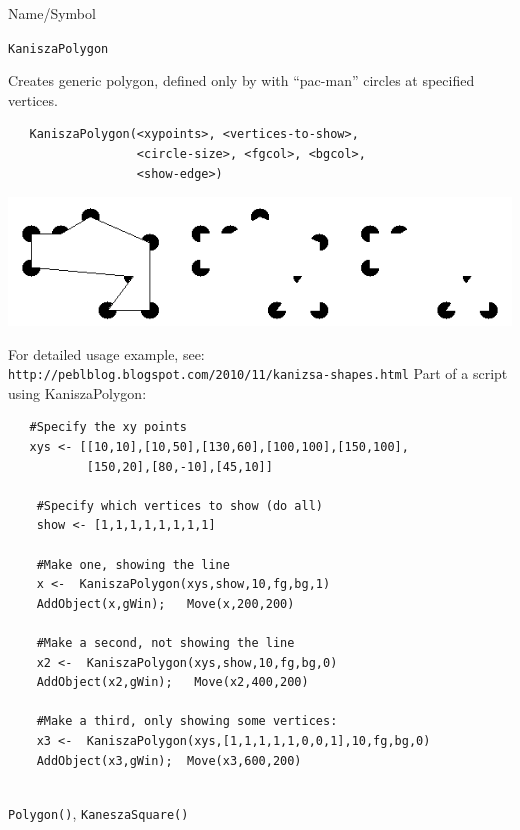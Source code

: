 \vfill
\newpage
{}
\vfill
\begin{desc}{Name/Symbol}
\item[Name/Symbol]	\verb+KaniszaPolygon+

\item[Description]	Creates generic polygon, defined only by with ``pac-man'' circles at specified vertices.  


\item[Usage]	
\begin{verbatim}
   KaniszaPolygon(<xypoints>, <vertices-to-show>,
                  <circle-size>, <fgcol>, <bgcol>, 
                  <show-edge>)
\end{verbatim}

\includegraphics[scale=.5]{images/kaniszapoly.png}
\item[Example]	
For detailed usage example, see:\\ \verb+http://peblblog.blogspot.com/2010/11/kanizsa-shapes.html+
Part of a script using KaniszaPolygon:	
\begin{verbatim}
   #Specify the xy points
   xys <- [[10,10],[10,50],[130,60],[100,100],[150,100],
           [150,20],[80,-10],[45,10]]
    
    #Specify which vertices to show (do all)
    show <- [1,1,1,1,1,1,1,1]
     
    #Make one, showing the line
    x <-  KaniszaPolygon(xys,show,10,fg,bg,1)
    AddObject(x,gWin);   Move(x,200,200)

    #Make a second, not showing the line
    x2 <-  KaniszaPolygon(xys,show,10,fg,bg,0)
    AddObject(x2,gWin);   Move(x2,400,200)

    #Make a third, only showing some vertices:
    x3 <-  KaniszaPolygon(xys,[1,1,1,1,1,0,0,1],10,fg,bg,0)
    AddObject(x3,gWin);  Move(x3,600,200)
        
\end{verbatim}


\item[See Also] \verb+Polygon()+, \verb+KaneszaSquare()+
\end{desc}

